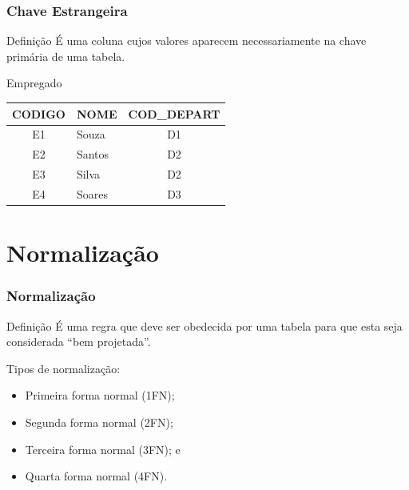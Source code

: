 \documentclass{beamer}
\begin{document}
\begin{frame}
\frametitle{Chave Estrangeira}

\begin{block}{Definição}
  É uma coluna cujos valores aparecem necessariamente na chave primária de uma tabela.
\end{block}\vfill

\begin{exampleblock}{Empregado}
\centering
\begin{tabular}{|c|l|c|}
	\hline
	CODIGO & NOME & COD\_DEPART  \\ \hline
	E1 & Souza & D1  \\ \hline
	E2 & Santos & D2 \\ \hline
	E3 & Silva &  D2\\ \hline
	E4 & Soares & D3 \\ \hline
\end{tabular}
\end{exampleblock}		
\end{frame}

\section{Normalização}

\begin{frame}
\frametitle{Normalização}

\begin{block}{Definição}
	É uma regra que deve ser obedecida por uma tabela para que esta seja
	considerada ``bem projetada''.
\end{block} \vfill

Tipos de normalização:
\begin{itemize}
	\item Primeira forma normal (1FN);
	\item Segunda forma normal (2FN);
	\item Terceira forma normal (3FN); e
	\item Quarta forma normal (4FN).
\end{itemize}

\end{frame}
\end{document}

